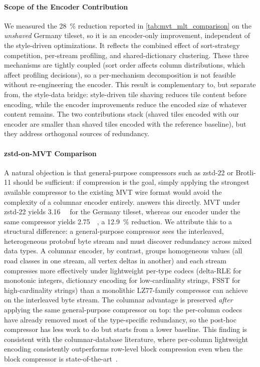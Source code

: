 \paragraph{Scope of the Encoder Contribution}
We measured the \qty{28}{\percent} reduction reported in \cref{tab:mvt_mlt_comparison} on the \emph{unshaved} Germany tileset, so it is an encoder-only improvement, independent of the style-driven optimizations.
It reflects the combined effect of sort-strategy competition, per-stream profiling, and shared-dictionary clustering.
These three mechanisms are tightly coupled (sort order affects column distributions, which affect profiling decisions), so a per-mechanism decomposition is not feasible without re-engineering the encoder.
This result is complementary to, but separate from, the style-data bridge: style-driven tile shaving reduces tile content before encoding, while the encoder improvements reduce the encoded size of whatever content remains.
The two contributions stack (shaved tiles encoded with our encoder are smaller than shaved tiles encoded with the reference baseline), but they address orthogonal sources of redundancy.

\paragraph{zstd-on-\acs{MVT} Comparison}
A natural objection is that general-purpose compressors such as zstd-22 or Brotli-11 should be sufficient: if compression is the goal, simply applying the strongest available compressor to the existing \ac{MVT} wire format would avoid the complexity of a columnar encoder entirely.
 answers this directly.
\ac{MVT} under zstd-22 yields \qty{3.16}{\giga\byte} for the Germany tileset, whereas our encoder under the same compressor yields \qty{2.75}{\giga\byte}, a \qty{12.9}{\percent} reduction.
We attribute this to a structural difference: a general-purpose compressor sees the interleaved, heterogeneous protobuf byte stream and must discover redundancy across mixed data types.
A columnar encoder, by contrast, groups homogeneous values (all road classes in one stream, all vertex deltas in another) and each stream compresses more effectively under lightweight per-type codecs (delta-\acs{RLE} for monotonic integers, dictionary encoding for low-cardinality strings, \ac{FSST} for high-cardinality strings) than a monolithic LZ77-family compressor can achieve on the interleaved byte stream.
The columnar advantage is preserved \emph{after} applying the same general-purpose compressor on top: the per-column codecs have already removed most of the type-specific redundancy, so the post-hoc compressor has less work to do but starts from a lower baseline.
This finding is consistent with the columnar-database literature, where per-column lightweight encoding consistently outperforms row-level block compression even when the block compressor is state-of-the-art~\cite{kuschewskiBtrBlocksEfficientColumnar2023}.


